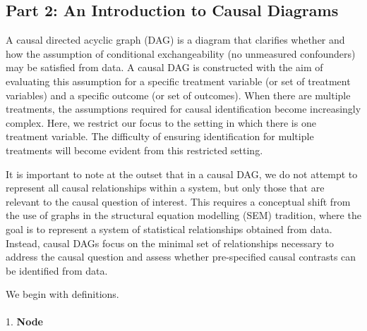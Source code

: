 \documentclass[
  singlecolumn]{article}
\makeatletter
\let\oldparagraph\paragraph
\renewcommand{\paragraph}{
    \@ifstar
      \xxxParagraphStar
      \xxxParagraphNoStar
  }
\newcommand{\xxxParagraphStar}[1]{\oldparagraph*{#1}\mbox{}}
\newcommand{\xxxParagraphNoStar}[1]{\oldparagraph{#1}\mbox{}}
\makeatother
\begin{document}
\subsection{Part 2: An Introduction to Causal
Diagrams}\label{section-part2}

A causal directed acyclic graph (DAG) is a diagram that clarifies
whether and how the assumption of conditional exchangeability (no
unmeasured confounders) may be satisfied from data. A causal DAG is
constructed with the aim of evaluating this assumption for a specific
treatment variable (or set of treatment variables) and a specific
outcome (or set of outcomes). When there are multiple treatments, the
assumptions required for causal identification become increasingly
complex. Here, we restrict our focus to the setting in which there is
one treatment variable. The difficulty of ensuring identification for
multiple treatments will become evident from this restricted setting.

It is important to note at the outset that in a causal DAG, we do not
attempt to represent all causal relationships within a system, but only
those that are relevant to the causal question of interest. This
requires a conceptual shift from the use of graphs in the structural
equation modelling (SEM) tradition, where the goal is to represent a
system of statistical relationships obtained from data. Instead, causal
DAGs focus on the minimal set of relationships necessary to address the
causal question and assess whether pre-specified causal contrasts can be
identified from data.

We begin with definitions.

\paragraph{\texorpdfstring{1. \textbf{Node}}{1. Node}}\label{node}
\end{document}
